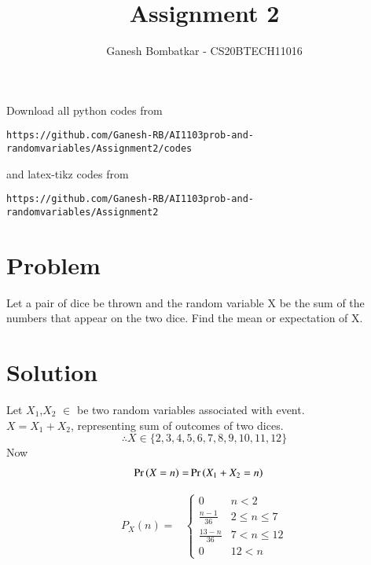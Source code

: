 \documentclass[journal,12pt,twocolumn]{IEEEtran}
\begin{document}
     \def\rightbox#1{\makebox[0in][r]{#1}}
     \def\centbox#1{\makebox[0in]{#1}}
     \def\topbox#1{\raisebox{-\baselineskip}[0in][0in]{#1}}
     \def\midbox#1{\raisebox{-0.5\baselineskip}[0in][0in]{#1}}
\vspace{3cm}
\title{Assignment 2}
\author{Ganesh Bombatkar - CS20BTECH11016}
\maketitle
\newpage
\bigskip
\renewcommand{\thefigure}{\theenumi}
\renewcommand{\thetable}{\theenumi}
Download all python codes from 
\vspace{0.1cm}
\begin{lstlisting}
https://github.com/Ganesh-RB/AI1103prob-and-randomvariables/Assignment2/codes
\end{lstlisting}
%
\vspace{0.2cm}
and latex-tikz codes from 
%
\vspace{0.1cm}
\begin{lstlisting}
https://github.com/Ganesh-RB/AI1103prob-and-randomvariables/Assignment2
\end{lstlisting}

\section{Problem}
Let a pair of dice be thrown and the random variable X be the sum of the numbers that appear on the two dice. Find the mean or expectation of X.
\vspace{0.1cm}

\section{Solution}
Let $X_1$,$X_2$ $\in$  be two random variables associated with event.
\\ $X=X_1+X_2$, representing sum of outcomes of two dices.
$$\therefore X\in \{2,3,4,5,6,7,8,9,10,11,12\}$$
Now
\begin{align}
    \Pr\left(X=n\right) =& \Pr\left(X_1+X_2=n\right)
\end{align}   

\begin{align}
    P_X{(n)} =&
    \begin{cases}
    0 & n<2
    \\ \frac{n-1}{36} &2 \le n \le 7
    \\ \frac{13-n}{36} & 7 < n \le 12
    \\ 0 & 12 < n
    \end{cases}
    \label{pmf_equation}
\end{align}
\end{document}
